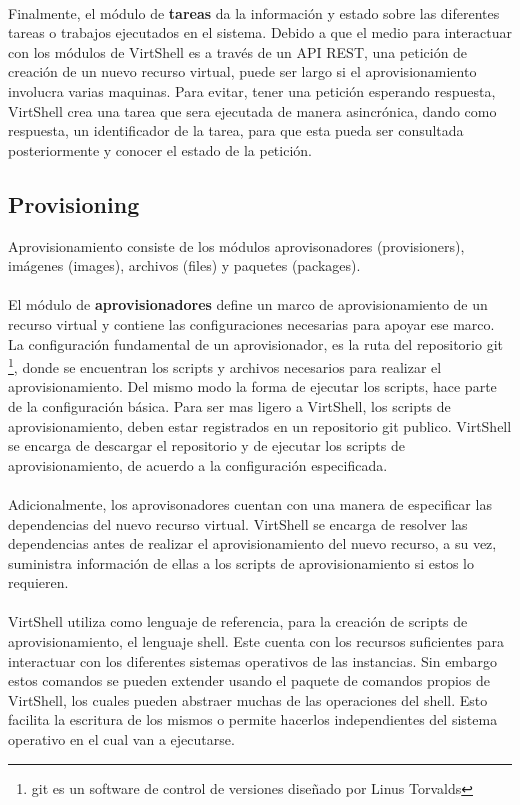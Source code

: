 \\
Finalmente, el módulo de \textbf{tareas} da la información y estado sobre las diferentes tareas o trabajos ejecutados en el sistema. Debido a que el medio para interactuar con los módulos de VirtShell es a través de un API REST, una petición de creación de un nuevo recurso virtual, puede ser largo si el aprovisionamiento involucra varias maquinas. Para evitar, tener una petición esperando respuesta, VirtShell crea una tarea que sera ejecutada de manera asincrónica, dando como respuesta, un identificador de la tarea, para que esta pueda ser consultada posteriormente y conocer el estado de la petición.


\subsection{Provisioning}
Aprovisionamiento consiste de los módulos aprovisonadores (provisioners), imágenes (images), archivos (files) y paquetes (packages).\\
\\
El módulo de \textbf{aprovisionadores} define un marco de aprovisionamiento de un recurso virtual y contiene las configuraciones necesarias para apoyar ese marco. La configuración fundamental de un aprovisionador, es la ruta del repositorio git \footnote{git es un software de control de versiones diseñado por Linus Torvalds}, donde se encuentran los scripts y archivos necesarios para realizar el aprovisionamiento. Del mismo modo la forma de ejecutar los scripts, hace parte de la configuración básica. Para ser mas ligero a VirtShell, los scripts de aprovisionamiento, deben estar registrados en un repositorio git publico. VirtShell se encarga de descargar el repositorio y de ejecutar los scripts de aprovisionamiento, de acuerdo a la configuración especificada. \\
\\
Adicionalmente, los aprovisonadores cuentan con una manera de especificar las dependencias del nuevo recurso virtual. VirtShell se encarga de resolver las dependencias antes de realizar el aprovisionamiento del nuevo recurso, a su vez, suministra información de ellas a los scripts de aprovisionamiento si estos lo requieren. \\
\\
VirtShell utiliza como lenguaje de referencia, para la creación de scripts de aprovisionamiento, el lenguaje shell. Este cuenta con los recursos suficientes para interactuar con los diferentes sistemas operativos de las instancias. Sin embargo estos comandos se pueden extender usando el paquete de comandos propios de VirtShell, los cuales pueden abstraer muchas de las operaciones del shell. Esto facilita la escritura de los mismos o permite hacerlos independientes del sistema operativo en el cual van a ejecutarse.\\
